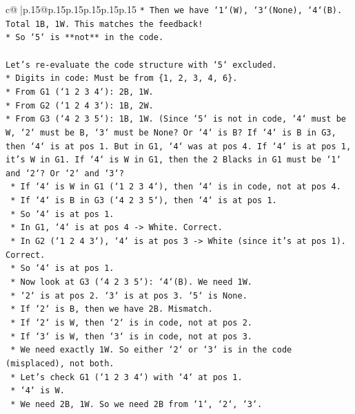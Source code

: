 \documentclass{article}
\begin{document}
{\begin{supertabular}{c@{$\;$}|p{.15\linewidth}@{}p{.15\linewidth}p{.15\linewidth}p{.15\linewidth}p{.15\linewidth}p{.15\linewidth}}
{{{\texttt{*   Then we have `1`(W), `3`(None), `4`(B). Total 1B, 1W. This matches the feedback!} \\
\texttt{*   So `5` is **not** in the code.} \\
\\ 
\texttt{Let's re{-}evaluate the code structure with `5` excluded.} \\
\texttt{*   Digits in code: Must be from \{1, 2, 3, 4, 6\}.} \\
\texttt{*   From G1 (`1 2 3 4`): 2B, 1W.} \\
\texttt{*   From G2 (`1 2 4 3`): 1B, 2W.} \\
\texttt{*   From G3 (`4 2 3 5`): 1B, 1W. (Since `5` is not in code, `4` must be W, `2` must be B, `3` must be None? Or `4` is B? If `4` is B in G3, then `4` is at pos 1. But in G1, `4` was at pos 4. If `4` is at pos 1, it's W in G1. If `4` is W in G1, then the 2 Blacks in G1 must be `1` and `2`? Or `2` and `3`?} \\
\texttt{    *   If `4` is W in G1 (`1 2 3 4`), then `4` is in code, not at pos 4.} \\
\texttt{    *   If `4` is B in G3 (`4 2 3 5`), then `4` is at pos 1.} \\
\texttt{    *   So `4` is at pos 1.} \\
\texttt{    *   In G1, `4` is at pos 4 {-}> White. Correct.} \\
\texttt{    *   In G2 (`1 2 4 3`), `4` is at pos 3 {-}> White (since it's at pos 1). Correct.} \\
\texttt{    *   So `4` is at pos 1.} \\
\texttt{    *   Now look at G3 (`4 2 3 5`): `4`(B). We need 1W.} \\
\texttt{        *   `2` is at pos 2. `3` is at pos 3. `5` is None.} \\
\texttt{        *   If `2` is B, then we have 2B. Mismatch.} \\
\texttt{        *   If `2` is W, then `2` is in code, not at pos 2.} \\
\texttt{        *   If `3` is W, then `3` is in code, not at pos 3.} \\
\texttt{        *   We need exactly 1W. So either `2` or `3` is in the code (misplaced), not both.} \\
\texttt{    *   Let's check G1 (`1 2 3 4`) with `4` at pos 1.} \\
\texttt{        *   `4` is W.} \\
\texttt{        *   We need 2B, 1W. So we need 2B from `1`, `2`, `3`.} \\
}}}
\end{supertabular}}
\end{document}
